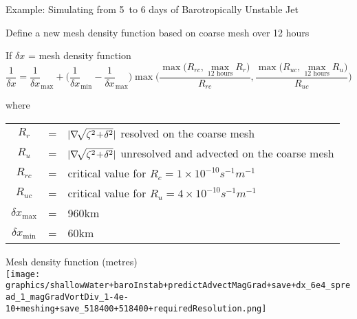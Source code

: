 \begin{slide}
{
    \normalfont
    Example: Simulating from 5\half\ to 6 days of Barotropically Unstable Jet
}


\end{slide}

\begin{slide}
{
    \normalfont\large\color{purple}
    Define a new mesh density function based on coarse mesh over 12 hours
}

\begin{raggedright}
If $\delta x$ = mesh density function
\vspace{-12pt}
\begin{equation*}
\frac{1}{\delta x} = \frac{1}{\delta x}_{\max}
+ \biggl(\frac{1}{\delta x}_{\min} - \frac{1}{\delta x}_{\max}\biggr)
\max
\biggl(
    \frac{\max\bigl( R_{rc},\underset{12\text{ hours}}{\max}R_r\bigr)}{R_{rc}},
    \frac{\max\bigl( R_{uc},\underset{12\text{ hours}}{\max}R_u\bigr)}{R_{uc}}
\biggr)
\end{equation*}\vfill
{
\setlength{\tabcolsep}{3pt}
\vspace{-12pt}where \begin{tabular}[t]{ccl}
$R_r$ & = & $|\nabla\negthinspace\sqrt{\zeta^2\negthinspace + \negthinspace \delta^2}|$ resolved on the coarse mesh \\
$R_u$ & = & $|\nabla\negthinspace\sqrt{\zeta^2\negthinspace + \negthinspace \delta^2}|$ unresolved and advected on the coarse mesh \\
$R_{rc}$ & = & critical value for $R_c = 1\times 10^{-10}s^{-1}m^{-1}$\\
$R_{uc}$ & = & critical value for $R_u = 4\times 10^{-10}s^{-1}m^{-1}$\\
$\delta x_{\max}$ & = & 960km \\
$\delta x_{\min}$ & = & 60km \\
\end{tabular}
}
\end{raggedright}

\begin{center}
Mesh density function (metres) \\
\texttt{[image: graphics/shallowWater+baroInstab+predictAdvectMagGrad+save+dx\_6e4\_spread\_1\_magGradVortDiv\_1-4e-10+meshing+save\_518400+518400+requiredResolution.png]}
\end{center}

\end{slide}

